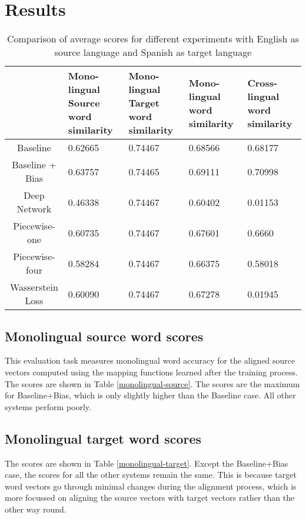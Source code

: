 \documentclass[11pt]{article}
\begin{document}
\section{Results}

\begin{table*}[ht]
  \begin{center}
  \begin{tabular}{|c|l|l|l|l|}
  \hline
   & \multicolumn{1}{|p{3cm}|}{Mono-lingual Source word similarity}& \multicolumn{1}{|p{3cm}|}{Mono-lingual Target word similarity} & \multicolumn{1}{|p{3cm}|}{Mono-lingual word similarity} & \multicolumn{1}{|p{3cm}|}{Cross-lingual word similarity} \\
  \hline
  Baseline & 0.62665 & 0.74467 & 0.68566 & 0.68177  \\
  \hline
  Baseline + Bias & 0.63757 & 0.74465 & 0.69111 & 0.70998 \\
  \hline
  Deep Network & 0.46338 & 0.74467 & 0.60402 & 0.01153 \\
  \hline
  Piecewise-one & 0.60735 & 0.74467 & 0.67601 & 0.6660 \\
  \hline
  Piecewise-four & 0.58284 & 0.74467 & 0.66375 & 0.58018 \\
  \hline
  Wasserstein Loss & 0.60090 & 0.74467 & 0.67278 & 0.01945 \\
  \hline
  \end{tabular}
  \end{center}
  \caption{ Comparison of average scores for different experiments with English as source language and Spanish as target language}
  \label{summary-table}
\end{table*}

\subsection{Monolingual source word scores}
This evaluation task measures monolingual word accuracy for the aligned source vectors computed using the mapping functions learned after the training process. The scores are shown in Table \ref{monolingual-source}. The scores are the maximum for Baseline+Bias, which is only slightly higher than the Baseline case. All other systems perform poorly.

\subsection{Monolingual target word scores}
The scores are shown in Table \ref{monolingual-target}. Except the Baseline+Bias case, the scores for all the other systems remain the same. This is because target word vectors go through minimal changes during the alignment process, which is more focussed on aligning the source vectors with target vectors rather than the other way round.
\end{document}
